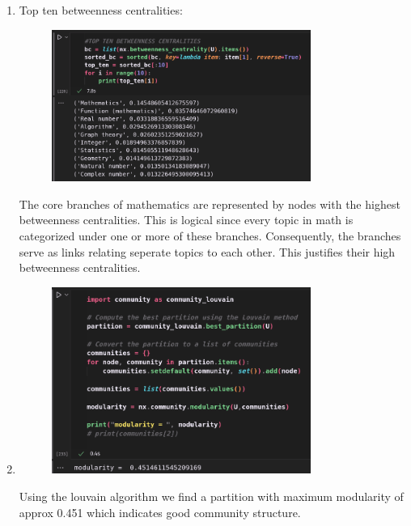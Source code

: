\documentclass{article}
\begin{document}
\begin{enumerate}[label=(\alph*), left=10pt, itemsep=10pt]
        \item \begin{minipage}[t]{0.9\textwidth}
            Top ten betweenness centralities:
            \begin{figure}[H]
                \centering
                \includegraphics[width=0.8\textwidth, height=0.3\textheight]{./3d.png}
            \end{figure}

            The core branches of mathematics are represented by nodes with the highest
            betweenness centralities. This is logical since every topic in math is categorized
            under one or more of these branches. Consequently, the branches serve as links
            relating seperate topics to each other. This justifies their high betweenness
            centralities.

        \end{minipage}

        \item \begin{minipage}[t]{0.9\textwidth}
            \begin{figure}[H]
                \centering
                \includegraphics[width=0.8\textwidth, height=0.3\textheight]{./3e.png}
            \end{figure}
            Using the louvain algorithm we find a partition with maximum modularity of approx
            0.451 which indicates good community structure.
        \end{minipage}
        

\end{enumerate}
\end{document}
